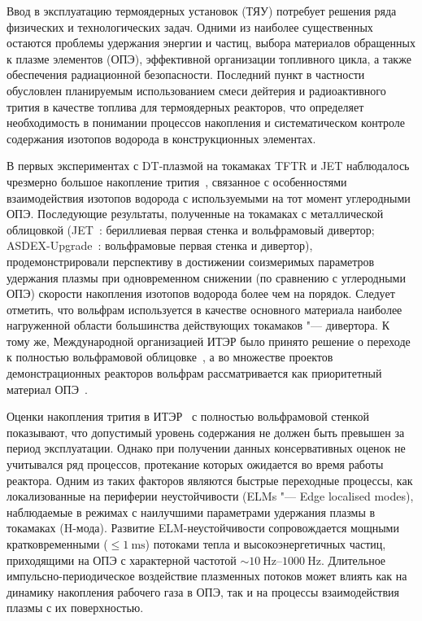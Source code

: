 Ввод в эксплуатацию термоядерных установок (ТЯУ) потребует решения ряда физических и технологических задач. Одними из наиболее существенных остаются проблемы удержания энергии и частиц, выбора материалов обращенных к плазме элементов (ОПЭ), эффективной организации топливного цикла, а также обеспечения радиационной безопасности. Последний пункт в частности обусловлен планируемым использованием смеси дейтерия и радиоактивного трития в качестве топлива для термоядерных реакторов, что определяет необходимость в понимании процессов накопления и систематическом контроле содержания изотопов водорода в конструкционных элементах.

В первых экспериментах с DT-плазмой на токамаках TFTR и JET наблюдалось чрезмерно большое накопление трития~\cite{Gasparyan2024}, связанное с особенностями взаимодействия изотопов водорода с используемыми на тот момент углеродными ОПЭ. Последующие результаты, полученные на токамаках с металлической облицовкой (JET~\cite{Maggi2024,Kappatou2025}: бериллиевая первая стенка и вольфрамовый дивертор; ASDEX-Upgrade~\cite{Rohde2009}: вольфрамовые первая стенка и дивертор), продемонстрировали перспективу в достижении соизмеримых параметров удержания плазмы при одновременном снижении (по сравнению с углеродными ОПЭ) скорости накопления изотопов водорода более чем на порядок. Следует отметить, что вольфрам используется в качестве основного материала наиболее нагруженной области большинства действующих токамаков "--- дивертора. К тому же, Международной организацией ИТЭР было принято решение о переходе к полностью вольфрамовой облицовке~\cite{Barabaschi2025}, а во множестве проектов демонстрационных реакторов вольфрам рассматривается как приоритетный материал ОПЭ~\cite{Bachmann2016}.

Оценки накопления трития в ИТЭР~\cite{Roth1,Pitts2025} с полностью вольфрамовой стенкой показывают, что допустимый уровень содержания не должен быть превышен за период эксплуатации. Однако при получении данных консервативных оценок не учитывался ряд процессов, протекание которых ожидается во время работы реактора. Одним из таких факторов являются быстрые переходные процессы, как локализованные на периферии неустойчивости (ELMs "--- Edge localised modes), наблюдаемые в режимах с наилучшими параметрами удержания плазмы в токамаках (H-мода). Развитие ELM-неустойчивости сопровождается мощными кратковременными ($\leq\SI{1}{\milli\second}$) потоками тепла и высокоэнергетичных частиц, приходящими на ОПЭ с характерной частотой \(\sim \SIrange{10}{1000}{\hertz}\). Длительное импульсно-периодическое воздействие плазменных потоков может влиять как на динамику накопления рабочего газа в ОПЭ, так и на процессы взаимодействия плазмы с их поверхностью.

